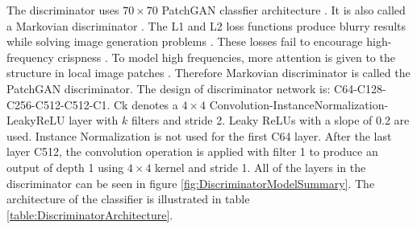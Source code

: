 The discriminator uses $70 \times 70$ PatchGAN classfier architecture \cite{isola2018imagetoimage}. It is also called a Markovian discriminator \cite{li2016precomputed}. The L1 and L2 loss functions produce blurry results while solving image generation problems \cite{ledig2017photorealistic}. These losses fail to encourage high-frequency crispness \cite{ledig2017photorealistic}. To model high frequencies, more attention is given to the structure in local image patches \cite{isola2018imagetoimage}. Therefore Markovian discriminator is called the PatchGAN discriminator. The design of discriminator network is: {\selectfont C64-C128-C256-C512-C512-C1}. {\selectfont Ck} denotes a $4 \times 4$ Convolution-InstanceNormalization-LeakyReLU layer with $k$ filters and stride 2. Leaky ReLUs with a slope of 0.2 are used. Instance Normalization is not used for the first {\selectfont C64} layer. After the last layer {\selectfont C512}, the convolution operation is applied with filter 1 to produce an output of depth 1 using $4 \times 4$ kernel and stride 1.  All of the layers in the discriminator can be seen in figure \ref{fig:DiscriminatorModelSummary}. The architecture of the classifier is illustrated in table \ref{table:DiscriminatorArchitecture}.





